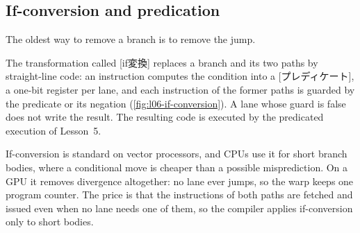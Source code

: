 \documentclass[../main.tex]{subfiles}
\begin{document}
\subsection{If-conversion and predication}

The oldest way to remove a branch is to remove the jump.

\begin{definition}[If-conversion]
  \label{def:l06-if-conversion}
  The transformation called [if変換] replaces a branch and its two paths by
  straight-line code: an instruction computes the condition into a
  [プレディケート], a one-bit register per lane, and
  each instruction of the former paths is guarded by the predicate or
  its negation (\cref{fig:l06-if-conversion}).  A lane whose guard is
  false does not write the result.  The resulting code is executed by
  the predicated execution of Lesson~5.
\end{definition}

\begin{marginfigure}
  \resizebox{\linewidth}{!}{}
  \caption{The branch of \cref{fig:l06-divergent-cfg} after
    if-conversion: one basic block whose guarded instructions every
    lane fetches.}
  \label{fig:l06-if-conversion}
\end{marginfigure}

If-conversion is standard on vector processors, and CPUs use it for
short branch bodies, where a conditional move is cheaper than a possible
misprediction.  On a GPU it removes divergence altogether: no
lane ever jumps, so the warp keeps one program counter.  The price is
that the instructions of both paths are fetched and issued even when no
lane needs one of them, so the compiler applies if-conversion only to
short bodies.
\end{document}
